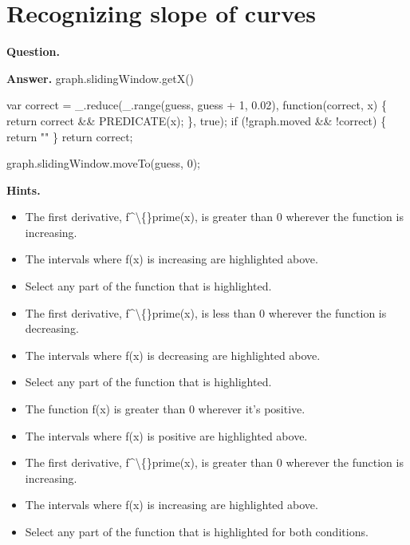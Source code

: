 \documentclass{article}
\begin{document}
\section*{Recognizing slope of curves}
\textbf{Question.} 

\textbf{Answer.} graph.slidingWindow.getX()
        
        
            var correct = \_.reduce(\_.range(guess, guess + 1, 0.02), function(correct, x) \{
                return correct \&\& PREDICATE(x);
            \}, true);
            if (!graph.moved \&\& !correct) \{
                return ""
            \}
            return correct;
        
        
            graph.slidingWindow.moveTo(guess, 0);

\textbf{Hints.}
\begin{itemize}
  \item The first derivative, f\textasciicircum{}\textbackslash\{\}prime(x), is greater
                    than 0 wherever the function is increasing.
  \item The intervals
                        where f(x) is increasing
                        are
                        highlighted above.
  \item Select any part of the function that is highlighted.
  \item The first derivative, f\textasciicircum{}\textbackslash\{\}prime(x), is less
                    than 0 wherever the function is decreasing.
  \item The intervals
                        where f(x) is decreasing
                        are
                        highlighted above.
  \item Select any part of the function that is highlighted.
  \item The function f(x) is greater than 0
                    wherever it's positive.
  \item The intervals
                        where f(x) is positive
                        are
                        highlighted above.
  \item The first derivative, f\textasciicircum{}\textbackslash\{\}prime(x), is greater
                    than 0 wherever the function is increasing.
  \item The intervals
                        where f(x) is increasing
                        are
                        highlighted above.
  \item Select any part of the function that is highlighted for
                        both conditions.

\end{itemize}
\end{document}
